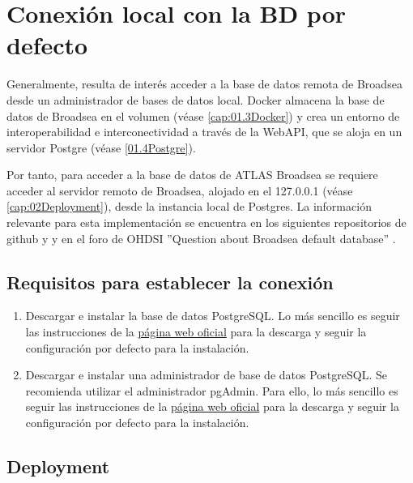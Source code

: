 \chapter{Conexión local con la BD por defecto} \label{cap:03ConexLocal}

Generalmente, resulta de interés acceder a la base de datos remota de Broadsea desde un administrador de bases de datos local.  Docker almacena la base de datos de Broadsea en el volumen  (véase \ref{cap:01.3Docker}) y crea un entorno de interoperabilidad e interconectividad a través de la WebAPI, que se aloja en un servidor Postgre (véase \ref{01.4Postgre}).

Por tanto, para acceder a la base de datos de ATLAS Broadsea se requiere acceder al servidor remoto de Broadsea, alojado en el 127.0.0.1 (véase \ref{cap:02Deployment}), desde la instancia local de Postgres. La información relevante para esta implementación se encuentra en los siguientes repositorios de github \cite{githubBroadsea} y \cite{githubBroadseaDB} y en el foro de OHDSI ''Question about Broadsea default database'' \cite{forumBroadseaDB}.

\section{Requisitos para establecer la conexión}

\begin{enumerate}

    \item Descargar e instalar la base de datos PostgreSQL. Lo más sencillo es seguir las instrucciones de la \href{https://www.postgresql.org/download/}{página web oficial} para la descarga y seguir la configuración por defecto para la instalación.

    \item Descargar e instalar una administrador de base de datos PostgreSQL. Se recomienda utilizar el administrador pgAdmin. Para ello, lo más sencillo es seguir las instrucciones de la \href{https://www.pgadmin.org/download/}{página web oficial} para la descarga y seguir la configuración por defecto para la instalación.
    
\end{enumerate}

\section{Deployment} \label{cap:03Deployment}

